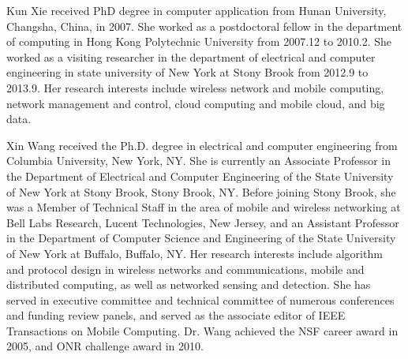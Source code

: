 \documentclass[10pt,journal,compsoc]{IEEEtran}
\begin{document}
\begin{IEEEbiography}{Kun Xie}
received PhD degree in computer application from Hunan University, Changsha, China,
in 2007. She worked as a postdoctoral fellow
in the department of computing in Hong Kong Polytechnic University from
2007.12 to 2010.2. She worked as a visiting researcher in the department
of electrical and computer engineering in state university of New York at
Stony Brook from 2012.9 to 2013.9.
Her research interests include wireless network and mobile
computing, network management and control, cloud computing and mobile
cloud, and big data.
\end{IEEEbiography}
\begin{IEEEbiography}{Xin Wang}
 received the Ph.D. degree in electrical and computer engineering from Columbia University, New York, NY.
She is currently an Associate Professor in the Department of Electrical and Computer Engineering of the State University of New York at Stony Brook, Stony Brook, NY. Before joining Stony Brook, she was a Member of Technical Staff in the area of mobile and wireless networking at Bell Labs Research, Lucent Technologies, New Jersey, and an Assistant Professor in the Department of Computer Science and Engineering of the State University of New York at Buffalo, Buffalo, NY. Her research interests include algorithm and protocol design in wireless networks and communications, mobile and distributed computing, as well as networked sensing and detection. She has served in executive committee and technical committee of numerous conferences and funding review panels, and served as the associate editor of IEEE Transactions on Mobile Computing. Dr. Wang achieved the NSF career award in 2005, and ONR challenge award in 2010.
\end{IEEEbiography}
\end{document}
